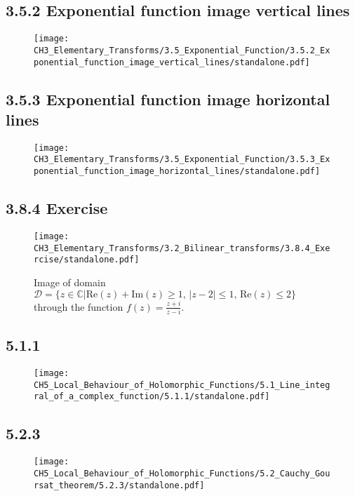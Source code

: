 \documentclass{book}
\begin{document}
\subsection*{3.5.2 Exponential function image vertical lines}
\begin{figure}[H]
\centering
\texttt{[image: CH3\_Elementary\_Transforms/3.5\_Exponential\_Function/3.5.2\_Exponential\_function\_image\_vertical\_lines/standalone.pdf]}
\caption{}
\end{figure}

\subsection*{3.5.3 Exponential function image horizontal lines}
\begin{figure}[H]
\centering
\texttt{[image: CH3\_Elementary\_Transforms/3.5\_Exponential\_Function/3.5.3\_Exponential\_function\_image\_horizontal\_lines/standalone.pdf]}
\caption{}
\end{figure}

\subsection*{3.8.4 Exercise}
\begin{figure}[H]
\centering
\texttt{[image: CH3\_Elementary\_Transforms/3.2\_Bilinear\_transforms/3.8.4\_Exercise/standalone.pdf]}
\caption{Image of domain $\mathcal{D} = \{z\in \mathbb{C} | \mathrm{Re}(z) + \mathrm{Im}(z) \ge 1, \, |z-2| \le 1, \, \mathrm{Re}(z) \le 2 \}$ through the function $f(z) = \frac{z+i}{z-i}$.}
\end{figure}

\subsection*{5.1.1}
\begin{figure}[H]
\centering
\texttt{[image: CH5\_Local\_Behaviour\_of\_Holomorphic\_Functions/5.1\_Line\_integral\_of\_a\_complex\_function/5.1.1/standalone.pdf]}
\caption{}
\end{figure}

\subsection*{5.2.3}
\begin{figure}[H]
\centering
\texttt{[image: CH5\_Local\_Behaviour\_of\_Holomorphic\_Functions/5.2\_Cauchy\_Goursat\_theorem/5.2.3/standalone.pdf]}
\caption{}
\end{figure}
\end{document}
